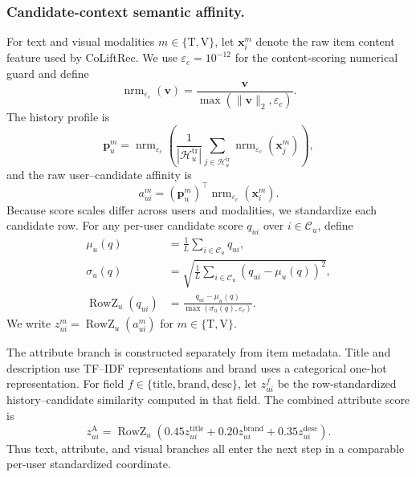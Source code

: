 \documentclass[sigconf,anonymous,review]{acmart}
\newcommand{\methodname}{CoLiftRec}
\begin{document}
\subsubsection{Candidate-context semantic affinity.}
For text and visual modalities $m\in\{\mathrm{T},\mathrm{V}\}$, let $\mathbf{x}_i^m$ denote the raw item content feature used by \methodname.
We use $\varepsilon_c=10^{-12}$ for the content-scoring numerical guard and define
\begin{equation}
    \operatorname{nrm}_{\varepsilon_c}(\mathbf{v})
    =
    \frac{\mathbf{v}}
    {\max(\|\mathbf{v}\|_2,\varepsilon_c)}.
\end{equation}
The history profile is
\begin{equation}
    \mathbf{p}_u^m
    =
    \operatorname{nrm}_{\varepsilon_c}\!\left(
    \frac{1}{|\mathcal{H}^{\mathrm{tr}}_u|}
    \sum_{j\in\mathcal{H}^{\mathrm{tr}}_u}
    \operatorname{nrm}_{\varepsilon_c}(\mathbf{x}_j^m)
    \right),
\end{equation}
and the raw user--candidate affinity is
\begin{equation}
    a_{ui}^m
    =
    \left(\mathbf{p}_u^m\right)^{\top}
    \operatorname{nrm}_{\varepsilon_c}(\mathbf{x}_i^m).
\end{equation}
Because score scales differ across users and modalities, we standardize each candidate row.
For any per-user candidate score $q_{ui}$ over $i\in\mathcal{C}_u$, define
\begin{align}
    \mu_u(q) &= \frac{1}{L}\sum_{i\in\mathcal{C}_u}q_{ui},\\
    \sigma_u(q) &=
    \sqrt{\frac{1}{L}\sum_{i\in\mathcal{C}_u}
    \left(q_{ui}-\mu_u(q)\right)^2},\\
    \operatorname{RowZ}_u(q_{ui})
    &=
    \frac{q_{ui}-\mu_u(q)}
    {\max(\sigma_u(q),\varepsilon_c)}.
    \label{eq:rowz}
\end{align}
We write $z_{ui}^{m}=\operatorname{RowZ}_u(a_{ui}^{m})$ for $m\in\{\mathrm{T},\mathrm{V}\}$.

The attribute branch is constructed separately from item metadata.
Title and description use TF--IDF representations and brand uses a categorical one-hot representation.
For field $f\in\{\mathrm{title},\mathrm{brand},\mathrm{desc}\}$, let $z_{ui}^{f}$ be the row-standardized history--candidate similarity computed in that field.
The combined attribute score is
\begin{equation}
    z_{ui}^{\mathrm{A}}
    =
    \operatorname{RowZ}_u\!\left(
      0.45 z_{ui}^{\mathrm{title}}
      +0.20 z_{ui}^{\mathrm{brand}}
      +0.35 z_{ui}^{\mathrm{desc}}
    \right).
    \label{eq:attribute}
\end{equation}
Thus text, attribute, and visual branches all enter the next step in a comparable per-user standardized coordinate.
\end{document}
